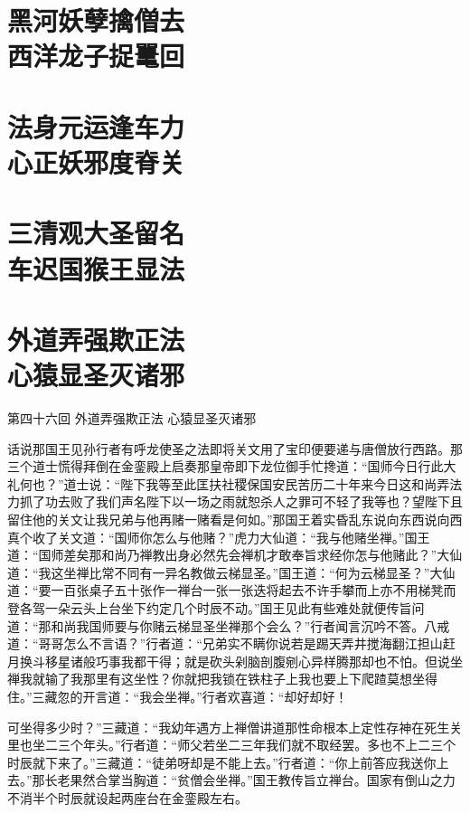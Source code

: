 \documentclass[12pt,UTF8]{ctexbook}
\begin{document}
{\chapter[黑河妖孽擒僧去\ 西洋龙子捉鼍回]{黑河妖孽擒僧去\\西洋龙子捉鼍回}
\chapter[法身元运逢车力\ 心正妖邪度脊关]{法身元运逢车力\\心正妖邪度脊关}
\chapter[三清观大圣留名\ 车迟国猴王显法]{三清观大圣留名\\车迟国猴王显法}
\chapter[外道弄强欺正法\ 心猿显圣灭诸邪]{外道弄强欺正法\\心猿显圣灭诸邪}

第四十六回 外道弄强欺正法 心猿显圣灭诸邪

话说那国王见孙行者有呼龙使圣之法即将关文用了宝印便要递与唐僧放行西路。那三个道士慌得拜倒在金銮殿上启奏那皇帝即下龙位御手忙搀道：“国师今日行此大礼何也？”道士说：“陛下我等至此匡扶社稷保国安民苦历二十年来今日这和尚弄法力抓了功去败了我们声名陛下以一场之雨就恕杀人之罪可不轻了我等也？望陛下且留住他的关文让我兄弟与他再赌一赌看是何如。”那国王着实昏乱东说向东西说向西真个收了关文道：“国师你怎么与他赌？”虎力大仙道：“我与他赌坐禅。”国王道：“国师差矣那和尚乃禅教出身必然先会禅机才敢奉旨求经你怎与他赌此？”大仙道：“我这坐禅比常不同有一异名教做云梯显圣。”国王道：“何为云梯显圣？”大仙道：“要一百张桌子五十张作一禅台一张一张迭将起去不许手攀而上亦不用梯凳而登各驾一朵云头上台坐下约定几个时辰不动。”国王见此有些难处就便传旨问道：“那和尚我国师要与你赌云梯显圣坐禅那个会么？”行者闻言沉吟不答。八戒道：“哥哥怎么不言语？”行者道：“兄弟实不瞒你说若是踢天弄井搅海翻江担山赶月换斗移星诸般巧事我都干得；就是砍头剁脑剖腹剜心异样腾那却也不怕。但说坐禅我就输了我那里有这坐性？你就把我锁在铁柱子上我也要上下爬蹅莫想坐得住。”三藏忽的开言道：“我会坐禅。”行者欢喜道：“却好却好！

可坐得多少时？”三藏道：“我幼年遇方上禅僧讲道那性命根本上定性存神在死生关里也坐二三个年头。”行者道：“师父若坐二三年我们就不取经罢。多也不上二三个时辰就下来了。”三藏道：“徒弟呀却是不能上去。”行者道：“你上前答应我送你上去。”那长老果然合掌当胸道：“贫僧会坐禅。”国王教传旨立禅台。国家有倒山之力不消半个时辰就设起两座台在金銮殿左右。

}
\end{document}

